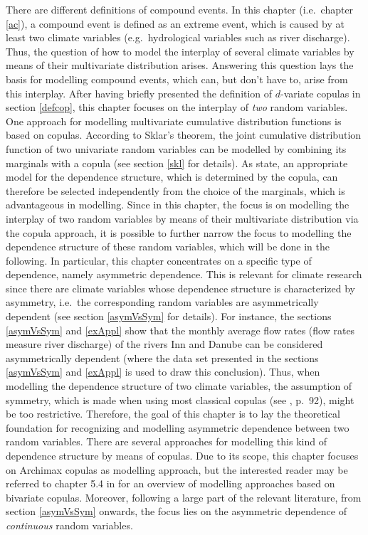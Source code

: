 \documentclass[
]{krantz}
\begin{document}
There are different definitions of compound events. In this chapter (i.e.~chapter \ref{ac}), a compound event is defined as an extreme event, which is caused by at least two climate variables (e.g.~hydrological variables such as river discharge). Thus, the question of how to model the interplay of several climate variables by means of their multivariate distribution arises. Answering this question lays the basis for modelling compound events, which can, but don't have to, arise from this interplay. After having briefly presented the definition of \(d\)-variate copulas in section \ref{defcop}, this chapter focuses on the interplay of \emph{two} random variables. One approach for modelling multivariate cumulative distribution functions is based on copulas. According to Sklar's theorem, the joint cumulative distribution function of two univariate random variables can be modelled by combining its marginals with a copula (see section \ref{skl} for details). As \citet{genest2007} state, an appropriate model for the dependence structure, which is determined by the copula, can therefore be selected independently from the choice of the marginals, which is advantageous in modelling. Since in this chapter, the focus is on modelling the interplay of two random variables by means of their multivariate distribution via the copula approach, it is possible to further narrow the focus to modelling the dependence structure of these random variables, which will be done in the following. In particular, this chapter concentrates on a specific type of dependence, namely asymmetric dependence. This is relevant for climate research since there are climate variables whose dependence structure is characterized by asymmetry, i.e.~the corresponding random variables are asymmetrically dependent (see section \ref{asymVsSym} for details). For instance, the sections \ref{asymVsSym} and \ref{exAppl} show that the monthly average flow rates (flow rates measure river discharge) of the rivers Inn and Danube can be considered asymmetrically dependent (where the data set presented in the sections \ref{asymVsSym} and \ref{exAppl} is used to draw this conclusion). Thus, when modelling the dependence structure of two climate variables, the assumption of symmetry, which is made when using most classical copulas (see \citet{genest2013}, p.~92), might be too restrictive. Therefore, the goal of this chapter is to lay the theoretical foundation for recognizing and modelling asymmetric dependence between two random variables. There are several approaches for modelling this kind of dependence structure by means of copulas. Due to its scope, this chapter focuses on Archimax copulas as modelling approach, but the interested reader may be referred to chapter 5.4 in \citet{genest2013} for an overview of modelling approaches based on bivariate copulas. Moreover, following a large part of the relevant literature, from section \ref{asymVsSym} onwards, the focus lies on the asymmetric dependence of \emph{continuous} random variables.
\end{document}
